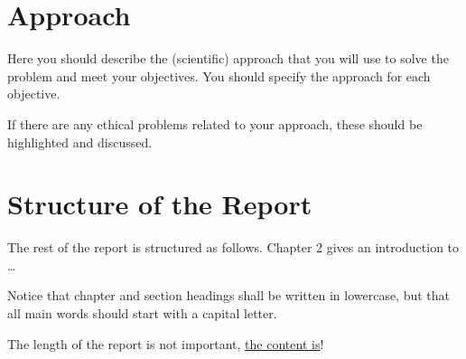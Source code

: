 \section{Approach}
Here you should describe the (scientific) approach that you will use to solve the problem and meet your objectives. You should specify the approach for each objective.

If there are any ethical problems related to your approach, these should be highlighted and discussed.
\section{Structure of the Report}
The rest of the report is structured as follows. Chapter 2 gives an introduction to \ldots

\begin{remark}
Notice that chapter and section headings shall be written in lowercase, but that all main words should start with a capital letter.
\end{remark}
\vspace{2pc}

The length of the report is not important, \underline{the content is}! 
